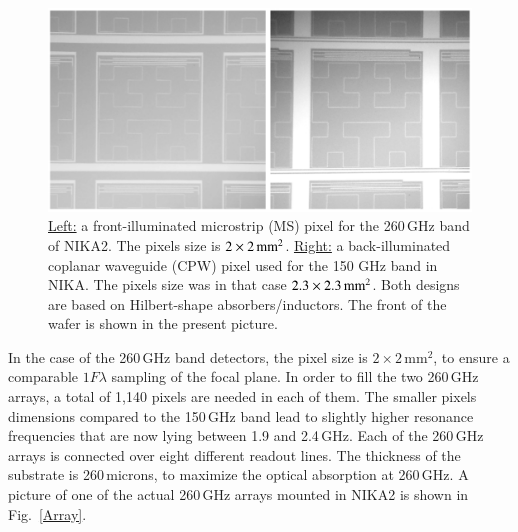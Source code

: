 \documentclass[]{aa} %
\begin{document}
\begin{figure}[h]
   \centering
  	\includegraphics[width=.95\linewidth]{fig3_AB.png}
     \caption{\underline{Left:} a front-illuminated microstrip (MS) pixel for the 260\,GHz band of NIKA2. The pixels size is $2\times2\textrm{\,mm}^2$. \underline{Right:} a back-illuminated coplanar waveguide (CPW) pixel used for the 150 GHz band in NIKA. The pixels size was in that case $2.3\times2.3\textrm{\,mm}^2$. Both designs are based on Hilbert-shape absorbers/inductors. The front of the wafer is shown in the present picture.}
         \label{Pixels}
\end{figure}

In the case of the 260\,GHz band detectors, the pixel size is $2\times 2\mathrm{\,mm}^2$, to ensure a comparable $1 F \lambda$ sampling of the focal plane. In order to fill the two 260\,GHz arrays, a total of 1,140 pixels are needed in each of them. The smaller pixels dimensions compared to the 150\,GHz band lead to slightly higher resonance frequencies that are now lying between 1.9 and 2.4\,GHz. Each of the 260\,GHz arrays is connected over eight different readout lines. The thickness of the substrate is 260\,microns, to maximize the optical absorption at 260\,GHz. A picture of one of the actual 260\,GHz arrays mounted in NIKA2 is shown in Fig.~\ref{Array}.
\end{document}
